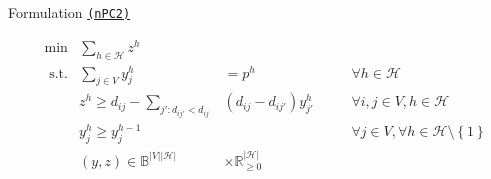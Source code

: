 \documentclass[utf8,aspectratio=1610,ngerman,english]{beamer}
\newcommand{\nPCY}{\hyperref[eq:nPCY]{\texttt{(nPC2)}}\xspace}
\newcommand{\inH}{h \in \mathcal H}
\begin{document}
\begin{frame}{Formulation \nPCY}
\begin{minipage}[t]{0.59\linewidth}
\begin{block}
\begin{subequations}
\begin{alignat}{4}
                     & \min         & \sum_{\inH}z^{h}                               &                                           &  &  &                                                             \\
                     & \text{ s.t.} & \sum_{j \in V}y_{j}^h                          & =     p^{h}                               &  &  & \forall \inH                                                \\
                     &              & z^{h} \geq d_{ij} - \sum_{j':d_{ij'} < d_{ij}} & (d_{ij} - d_{ij'})y_{j'}^h \;             &  &  & \forall i,j \in V, h \in \mathcal H                         \label{eq:nPCY-zpush}\\
                     &              & y_{j}^h \geq  y_j^{h-1}                        &                                           &  &  & \forall j \in V, \forall \inH \setminus \left \{1 \right \} \\
                     &              & (y,z) \in \mathbb B^{|V||\mathcal H|}          & \times \mathbb{R}_{\geq 0}^{|\mathcal H|} &  &  &
                \end{alignat}
            \end{subequations}
            \vspace{-9pt}
        \end{block}
    \end{minipage}
\end{frame}
\end{document}
